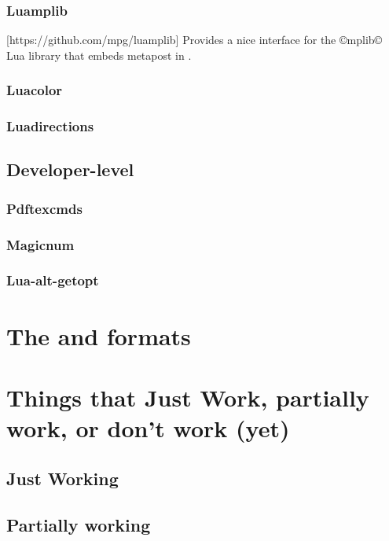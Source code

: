 \documentclass{lltxdoc}
\begin{document}
\subsubsection{Luamplib}

[https://github.com/mpg/luamplib]
Provides a nice interface for the ©mplib© Lua library that embeds metapost in
\luatex.

\subsubsection{Luacolor}

\subsubsection{Luadirections}

\subsection{Developer-level}

\subsubsection{Pdftexcmds}

\subsubsection{Magicnum}

\subsubsection{Lua-alt-getopt}

\section{The \luatex and \lualatex formats}

\section{Things that Just Work, partially work, or don't work (yet)}

\subsection{Just Working}

\subsection{Partially working}
\end{document}
